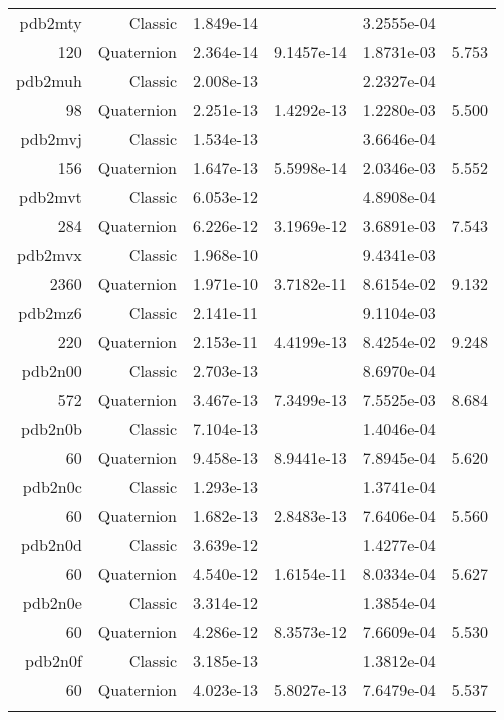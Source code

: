 \begin{xltabular}{\textwidth}{r|rS[table-format=1.3e+2]S[table-format=1.4e+2]S[table-format=1.4e+2]S[table-format=-1.3]}
pdb2mty & Classic & 1.849e-14 &  & 3.2555e-04 & \\
120 & Quaternion & 2.364e-14 & 9.1457e-14 & 1.8731e-03 & 5.753\\  \addlinespace
pdb2muh & Classic & 2.008e-13 &  & 2.2327e-04 & \\
98 & Quaternion & 2.251e-13 & 1.4292e-13 & 1.2280e-03 & 5.500\\  \addlinespace
pdb2mvj & Classic & 1.534e-13 &  & 3.6646e-04 & \\
156 & Quaternion & 1.647e-13 & 5.5998e-14 & 2.0346e-03 & 5.552\\  \addlinespace
pdb2mvt & Classic & 6.053e-12 &  & 4.8908e-04 & \\
284 & Quaternion & 6.226e-12 & 3.1969e-12 & 3.6891e-03 & 7.543\\  \addlinespace
pdb2mvx & Classic & 1.968e-10 &  & 9.4341e-03 & \\
2360 & Quaternion & 1.971e-10 & 3.7182e-11 & 8.6154e-02 & 9.132\\  \addlinespace
pdb2mz6 & Classic & 2.141e-11 &  & 9.1104e-03 & \\
220 & Quaternion & 2.153e-11 & 4.4199e-13 & 8.4254e-02 & 9.248\\  \addlinespace
pdb2n00 & Classic & 2.703e-13 &  & 8.6970e-04 & \\
572 & Quaternion & 3.467e-13 & 7.3499e-13 & 7.5525e-03 & 8.684\\  \addlinespace
pdb2n0b & Classic & 7.104e-13 &  & 1.4046e-04 & \\
60 & Quaternion & 9.458e-13 & 8.9441e-13 & 7.8945e-04 & 5.620\\  \addlinespace
pdb2n0c & Classic & 1.293e-13 &  & 1.3741e-04 & \\
60 & Quaternion & 1.682e-13 & 2.8483e-13 & 7.6406e-04 & 5.560\\  \addlinespace
pdb2n0d & Classic & 3.639e-12 &  & 1.4277e-04 & \\
60 & Quaternion & 4.540e-12 & 1.6154e-11 & 8.0334e-04 & 5.627\\  \addlinespace
pdb2n0e & Classic & 3.314e-12 &  & 1.3854e-04 & \\
60 & Quaternion & 4.286e-12 & 8.3573e-12 & 7.6609e-04 & 5.530\\  \addlinespace
pdb2n0f & Classic & 3.185e-13 &  & 1.3812e-04 & \\
60 & Quaternion & 4.023e-13 & 5.8027e-13 & 7.6479e-04 & 5.537\\  \addlinespace

\end{xltabular}
